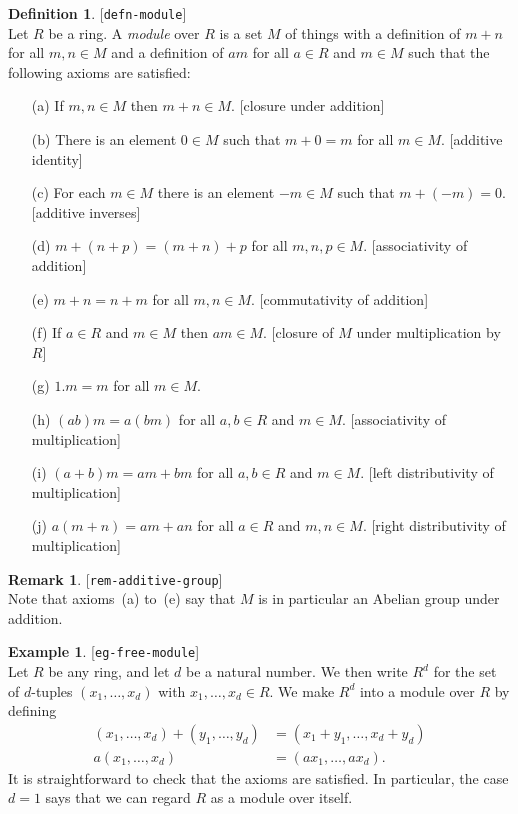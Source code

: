 \documentclass{amsart}
\newcommand{\lbl}[1]{\label{#1}\textup{[\texttt{#1}]}\ \\}
\newcommand{\lbl}{\label}
\renewcommand{\:}{\colon}
\theoremstyle{definition}
\newtheorem{remark}[theorem]{Remark}
\newtheorem{definition}[theorem]{Definition}
\newtheorem{example}[theorem]{Example}
\begin{document}
\begin{definition}\lbl{defn-module}
 Let $R$ be a ring.  A \emph{module} over $R$ is a set $M$ of things
 with a definition of $m+n$ for all $m,n\in M$ and a definition of
 $am$ for all $a\in R$ and $m\in M$ such that the following axioms are
 satisfied:
 \begin{itemize}
 \item[(a)] If $m,n\in M$ then $m+n\in M$. [closure under addition]
 \item[(b)] There is an element $0\in M$ such that $m+0=m$ for all
  $m\in M$. [additive identity]
 \item[(c)] For each $m\in M$ there is an element $-m\in M$ such that
  $m+(-m)=0$. [additive inverses]
 \item[(d)] $m+(n+p)=(m+n)+p$ for all $m,n,p\in M$.
  [associativity of addition]
 \item[(e)] $m+n=n+m$ for all $m,n\in M$.
  [commutativity of addition]
 \item[(f)] If $a\in R$ and $m\in M$ then $am\in M$.
  [closure of $M$ under multiplication by $R$]
 \item[(g)] $1.m=m$ for all $m\in M$.
 \item[(h)] $(ab)m=a(bm)$  for all $a,b\in R$ and $m\in M$.
  [associativity of multiplication]
 \item[(i)] $(a+b)m=am+bm$ for all $a,b\in R$ and $m\in M$.
  [left distributivity of multiplication]
 \item[(j)] $a(m+n)=am+an$ for all $a\in R$ and $m,n\in M$.
  [right distributivity of multiplication]
 \end{itemize}
\end{definition}
\begin{remark}\lbl{rem-additive-group}
 Note that axioms~(a) to~(e) say that $M$ is in particular an Abelian
 group under addition.
\end{remark}
\begin{example}\lbl{eg-free-module}
 Let $R$ be any ring, and let $d$ be a natural number.  We then write
 $R^d$ for the set of $d$-tuples $(x_1,\ldots,x_d)$ with
 $x_1,\ldots,x_d\in R$.  We make $R^d$ into a module over $R$ by
 defining 
 \begin{align*}
  (x_1,\ldots,x_d) + (y_1,\ldots,y_d) &= 
    (x_1+y_1,\ldots,x_d+y_d) \\
  a (x_1,\ldots,x_d) &= (ax_1,\ldots,ax_d).
 \end{align*}
 It is straightforward to check that the axioms are satisfied.  In
 particular, the case $d=1$ says that we can regard $R$ as a module
 over itself.  
\end{example}
\end{document}
